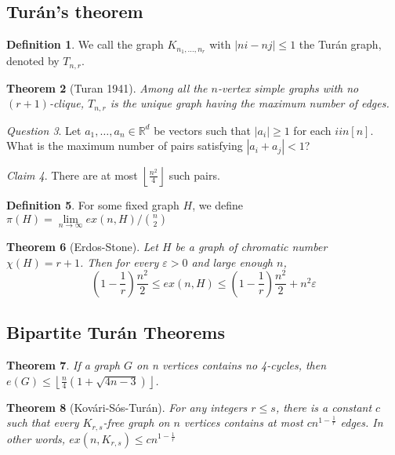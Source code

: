 \documentclass[10pt, fleqn, a4paper, landscape]{article}
\theoremstyle{plain} %
\newtheorem{thm}{Theorem}
\theoremstyle{remark} %
\newtheorem{claim}[thm]{Claim}
\newtheorem{que}[thm]{Question}
\theoremstyle{definition} %
\newtheorem{defi}[thm]{Definition}
\begin{document}
\begin{multicols}{3}
\begin{tiny}
\subsection{Turán’s theorem}
\begin{defi}
We call the graph $K_{n_1,\dots,n_r}$ with $|ni - nj|\le 1$ the Turán graph, denoted by $T_{n,r}$.
\end{defi}

\begin{thm}[Turan 1941]
Among all the $n$-vertex simple graphs with no $(r + 1)$-clique, $T_{n,r}$ is
the unique graph having the maximum number of edges.
\end{thm} 

\begin{que}
Let $a_1, \dots , a_n \in \mathbb{R}^d$ be vectors such that $|a_i|\ge 1$ for each $i in [n]$. What is the maximum number of pairs satisfying $|a_i + a_j| < 1$?
\end{que}

\begin{claim}
There are at most $\left\lfloor \frac{n^2}{4}\right\rfloor$ such pairs.
\end{claim}

\begin{defi}
For some fixed graph $H$, we define $\pi(H) = \lim\limits_{n\to\infty} ex(n,H)/\binom{n}{2}$
\end{defi}

\begin{thm}[Erdos-Stone]
Let $H$ be a graph of chromatic number $\chi(H) = r + 1$. Then for
every $\varepsilon > 0$ and large enough $n$, \[\left(1-\frac{1}{r}\right)\frac{n^2}{2}\le ex(n,H)\le\left(1-\frac{1}{r}\right)\frac{n^2}{2}+n^2\varepsilon\]
\end{thm}
 \addtocounter{thm}{1}
\subsection{Bipartite Turán Theorems}

\begin{thm}
If a graph $G$ on n vertices contains no 4-cycles, then $e(G)\le\left\lfloor\frac{n}{4}(1+\sqrt{4n-3})\right\rfloor$.
\end{thm}
\addtocounter{thm}{1}
\begin{thm}[Kovári-Sós-Turán]
For any integers $r \le s$, there is a constant $c$ such that every
$K_{r,s}$-free graph on $n$ vertices contains at most $cn^{1-\frac{1}{r}}$ edges. In other words, $ex(n,K_{r,s}) \le cn^{1-\frac{1}{r}}$ 
\end{thm}


\end{tiny}
\end{multicols}
\end{document}
